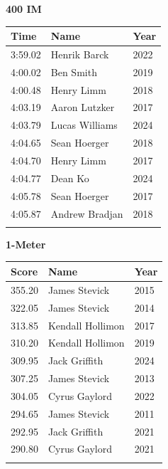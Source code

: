 \hfill
\begin{minipage}[t]{0.48\textwidth}
\centering
\textbf{\textcolor{teamprimary}{400 IM}}\par
\vspace{0.5em}
\centering
\small
\renewcommand{\arraystretch}{1.0}
\setlength{\tabcolsep}{4pt}
\begin{tabular}{@{}p{1.8cm}p{3.0cm}p{1.0cm}@{}}
\toprule
\textbf{Time} & \textbf{Name} & \textbf{Year} \\
\midrule
3:59.02 & Henrik Barck & 2022 \\
4:00.02 & Ben Smith & 2019 \\
4:00.48 & Henry Limm & 2018 \\
4:03.19 & Aaron Lutzker & 2017 \\
4:03.79 & Lucas Williams & 2024 \\
4:04.65 & Sean Hoerger & 2018 \\
4:04.70 & Henry Limm & 2017 \\
4:04.77 & Dean Ko & 2024 \\
4:05.78 & Sean Hoerger & 2017 \\
4:05.87 & Andrew Bradjan & 2018 \\
\bottomrule
\vspace{0.5em}
\end{tabular}
\end{minipage}
\vspace{1.2em}
\noindent\begin{minipage}[t]{0.48\textwidth}
\centering
\textbf{\textcolor{teamprimary}{1-Meter}}\par
\vspace{0.5em}
\centering
\small
\renewcommand{\arraystretch}{1.0}
\setlength{\tabcolsep}{4pt}
\begin{tabular}{@{}p{1.8cm}p{3.0cm}p{1.0cm}@{}}
\toprule
\textbf{Score} & \textbf{Name} & \textbf{Year} \\
\midrule
355.20 & James Stevick & 2015 \\
322.05 & James Stevick & 2014 \\
313.85 & Kendall Hollimon & 2017 \\
310.20 & Kendall Hollimon & 2019 \\
309.95 & Jack Griffith & 2024 \\
307.25 & James Stevick & 2013 \\
304.05 & Cyrus Gaylord & 2022 \\
294.65 & James Stevick & 2011 \\
292.95 & Jack Griffith & 2021 \\
290.80 & Cyrus Gaylord & 2021 \\
\bottomrule
\vspace{0.5em}
\end{tabular}
\end{minipage}
